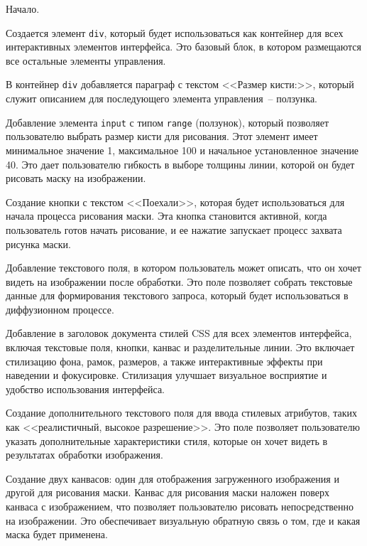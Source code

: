 \begin{enumerate_step}
    \item Начало.
    \item Создается элемент \lstinline{div}, который будет использоваться как контейнер для всех интерактивных элементов интерфейса. Это базовый блок, в котором размещаются все остальные элементы управления.
    \item В контейнер \lstinline{div} добавляется параграф с текстом <<Размер кисти:>>, который служит описанием для последующего элемента управления~-- ползунка.
    \item Добавление элемента \lstinline{input} с типом \lstinline{range} (ползунок), который позволяет пользователю выбрать размер кисти для рисования. Этот элемент имеет минимальное значение 1, максимальное 100 и начальное установленное значение 40. Это дает пользователю гибкость в выборе толщины линии, которой он будет рисовать маску на изображении.
    \item Создание кнопки с текстом <<Поехали>>, которая будет использоваться для начала процесса рисования маски. Эта кнопка становится активной, когда пользователь готов начать рисование, и ее нажатие запускает процесс захвата рисунка маски.
    \item Добавление текстового поля, в котором пользователь может описать, что он хочет видеть на изображении после обработки. Это поле позволяет собрать текстовые данные для формирования текстового запроса, который будет использоваться в диффузионном процессе.
    \item Добавление в заголовок документа стилей CSS для всех элементов интерфейса, включая текстовые поля, кнопки, канвас и разделительные линии. Это включает стилизацию фона, рамок, размеров, а также интерактивные эффекты при наведении и фокусировке. Стилизация улучшает визуальное восприятие и удобство использования интерфейса.
    \item Создание дополнительного текстового поля для ввода стилевых атрибутов, таких как <<реалистичный, высокое разрешение>>. Это поле позволяет пользователю указать дополнительные характеристики стиля, которые он хочет видеть в результатах обработки изображения.
    \item Создание двух канвасов: один для отображения загруженного изображения и другой для рисования маски. Канвас для рисования маски наложен поверх канваса с изображением, что позволяет пользователю рисовать непосредственно на изображении. Это обеспечивает визуальную обратную связь о том, где и какая маска будет применена.

\end{enumerate_step}
